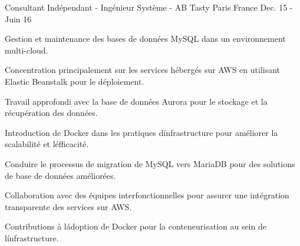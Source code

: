 \begin{cventries}
\cventry
{Consultant Indépendant - Ingénieur Système - } %
{AB Tasty} %
{Paris France} %
{Dec. 15 - Juin 16} %
{
  \begin{cvitems} %
    \item {Gestion et maintenance des bases de données MySQL dans un environnement multi-cloud.}
    \item {Concentration principalement sur les services hébergés sur AWS en utilisant Elastic Beanstalk pour le déploiement.}
    \item {Travail approfondi avec la base de données Aurora pour le stockage et la récupération des données.}
    \item {Introduction de Docker dans les pratiques d\' infrastructure pour améliorer la scalabilité et l\' efficacité.}
    \item {Conduire le processus de migration de MySQL vers MariaDB pour des solutions de base de données améliorées.}
    \item {Collaboration avec des équipes interfonctionnelles pour assurer une intégration transparente des services sur AWS.}
    \item {Contributions à l\' adoption de Docker pour la conteneurisation au sein de l\' infrastructure.}
  \end{cvitems}
}


\end{cventries}


